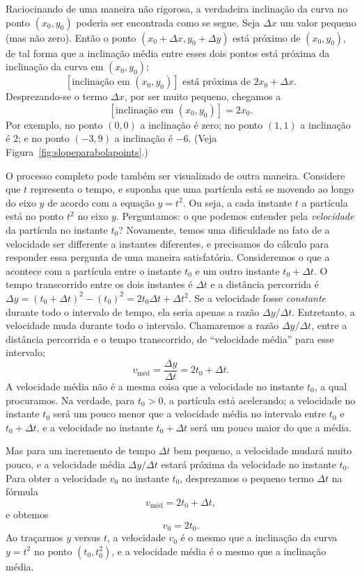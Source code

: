 Raciocinando de uma maneira não rigorosa, a verdadeira inclinação da
curva no ponto $(x_0, y_0)$ poderia ser encontrada como se segue.
Seja $\Delta x$ um valor pequeno (mas não zero). Então o ponto
$(x_0 + \Delta x, y_0 + \Delta y)$ está próximo de $(x_0, y_0)$,
de tal forma que a inclinação média entre esses dois pontos está
próxima da inclinação da curva em $(x_0, y_0)$;
\[
  [\text{inclinação em } (x_0, y_0)] \text{ está próxima de } 2x_0 + \Delta x.
\]
Desprezando-se o termo $\Delta x$, por ser muito pequeno, chegamos
a
\[
  [\text{inclinação em } (x_0, y_0)] = 2x_0.
\]
Por exemplo, no ponto $(0, 0)$ a inclinação é zero; no ponto $(1, 1)$
a inclinação é $2$; e no ponto $(-3, 9)$ a inclinação é $-6$.
(Veja Figura~\ref{fig:slopeparabolapoints}.)


O processo completo pode também ser visualizado de outra maneira.
Considere que $t$ representa o tempo, e suponha que uma partícula
está se movendo ao longo do eixo $y$ de acordo com a equação
$y = t^2$. Ou seja, a cada instante $t$ a partícula está no ponto
$t^2$ no eixo $y$. Perguntamos: o que podemos entender pela
\emph{velocidade} da partícula no instante $t_0$?
Novamente, temos
uma dificuldade no fato de a velocidade ser differente a instantes
diferentes, e precisamos do cálculo para responder essa pergunta
de uma maneira satisfatória. Consideremos o que a acontece com
a partícula entre o instante $t_0$ e um outro instante
$t_0 + \Delta t$. O tempo transcorrido entre os dois instantes
é $\Delta t$ e a distância percorrida é
$\Delta y = (t_0 + \Delta t)^2 - (t_0)^2 = 2t_0 \Delta t + \Delta t^2$.
Se a velocidade fosse \emph{constante} durante todo o intervalo de tempo,
ela seria apenas a razão $\Delta y / \Delta t$. Entretanto, a velocidade
muda durante todo o intervalo. Chamaremos a razão $\Delta y / \Delta t$,
entre a distância percorrida e o tempo transcorrido, de ``velocidade
média'' para esse intervalo;
\[
  v_{\text{méd}} = \frac{\Delta y}{\Delta t} = 2t_0 + \Delta t.
\]
A velocidade média não é a mesma coisa que a velocidade no instante
$t_0$, a qual procuramos. Na verdade, para $t_0 > 0$, a partícula
está acelerando; a velocidade no instante $t_0$ será um pouco menor
que a velocidade média no intervalo entre $t_0$ e $t_0 + \Delta t$,
e a velocidade no instante $t_0 + \Delta t$ será um pouco maior do
que a média.

Mas para um incremento de tempo $\Delta t$ bem pequeno, a velocidade
mudará muito pouco, e a velocidade média $\Delta y/\Delta t$ estará
próxima da velocidade no instante $t_0$. Para obter a velocidade
$v_0$ no instante $t_0$, desprezamos o pequeno termo $\Delta t$ na
fórmula
\[
  v_{\text{méd}} = 2 t_0 + \Delta t,
\]
e obtemos
\[
  v_0 = 2t_0.
\]
Ao traçarmos $y$ versus $t$, a velocidade $v_0$ é o mesmo que a
inclinação da curva $y = t^2$ no ponto $(t_0, t_0^2)$, e a velocidade
média é o mesmo que a inclinação média.


